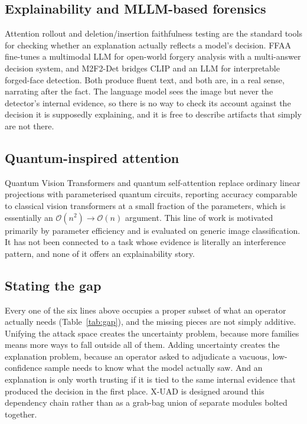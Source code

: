 \documentclass[conference]{IEEEtran}
\begin{document}
\subsection{Explainability and MLLM-based forensics}
Attention rollout \cite{abnar2020rollout} and deletion/insertion faithfulness
testing \cite{petsiuk2018rise} are the standard tools for checking whether an
explanation actually reflects a model's decision. FFAA \cite{huang2024ffaa}
fine-tunes a multimodal LLM for open-world forgery analysis with a multi-answer
decision system, and M2F2-Det \cite{guo2025m2f2det} bridges CLIP and an LLM for
interpretable forged-face detection. Both produce fluent text, and both are, in a
real sense, narrating after the fact. The language model sees the image but never
the detector's internal evidence, so there is no way to check its account against
the decision it is supposedly explaining, and it is free to describe artifacts that
simply are not there.

\subsection{Quantum-inspired attention}
Quantum Vision Transformers \cite{cherrat2024qvt} and quantum self-attention
\cite{comajoan2024qgluon,evans2025on} replace ordinary linear projections with
parameterised quantum circuits, reporting accuracy comparable to classical vision
transformers at a small fraction of the parameters, which is essentially an
$\mathcal{O}(n^{2})\to\mathcal{O}(n)$ argument. This line of work is motivated
primarily by parameter efficiency and is evaluated on generic image classification.
It has not been connected to a task whose evidence is literally an interference
pattern, and none of it offers an explainability story.

\subsection{Stating the gap}
Every one of the six lines above occupies a proper subset of what an operator
actually needs (Table~\ref{tab:gap}), and the missing pieces are not simply
additive. Unifying the attack space creates the uncertainty problem, because more
families means more ways to fall outside all of them. Adding uncertainty creates the
explanation problem, because an operator asked to adjudicate a vacuous,
low-confidence sample needs to know what the model actually saw. And an explanation
is only worth trusting if it is tied to the same internal evidence that produced the
decision in the first place. X-UAD is designed around this dependency chain rather
than as a grab-bag union of separate modules bolted together.
\end{document}

